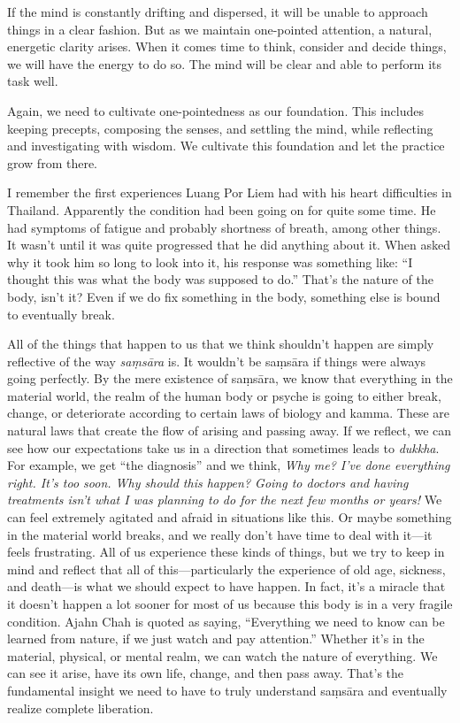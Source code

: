 If the mind is constantly drifting and dispersed, it will be unable to 
approach things in a clear fashion. But as we maintain one-pointed 
attention, a natural, energetic clarity arises. When it comes time to 
think, consider and decide things, we will have the energy to do so. 
The mind will be clear and able to perform its task well.

Again, we need to cultivate one-pointedness as our foundation. This 
includes keeping precepts, composing the senses, and settling the mind, 
while reflecting and investigating with wisdom. We cultivate this 
foundation and let the practice grow from there.


I remember the first experiences Luang Por Liem had with his heart 
difficulties in Thailand. Apparently the condition had been going on 
for quite some time. He had symptoms of fatigue and probably shortness 
of breath, among other things. It wasn't until it was quite progressed 
that he did anything about it. When asked why it took him so long to 
look into it, his response was something like: ``I thought this was 
what the body was supposed to do.'' That's the nature of the body, 
isn't it? Even if we do fix something in the body, something else is 
bound to eventually break.

All of the things that happen to us that we think shouldn't happen are 
simply reflective of the way \emph{saṃsāra} is. It wouldn't be 
saṃsāra if things were always going perfectly. By the mere existence 
of saṃsāra, we know that everything in the material world, the realm 
of the human body or psyche is going to either break, change, or 
deteriorate according to certain laws of biology and kamma. These are 
natural laws that create the flow of arising and passing away. If we 
reflect, we can see how our expectations take us in a direction that 
sometimes leads to \emph{dukkha}. For example, we get ``the diagnosis'' 
and we think, \emph{Why me? I've done everything right. It's too soon. 
Why should this happen? Going to doctors and having treatments isn't 
what I was planning to do for the next few months or years!} We can 
feel extremely agitated and afraid in situations like this. Or maybe 
something in the material world breaks, and we really don't have time 
to deal with it---it feels frustrating. All of us experience these 
kinds of things, but we try to keep in mind and reflect that all of 
this---particularly the experience of old age, sickness, and death---is 
what we should expect to have happen. In fact, it's a miracle that it 
doesn't happen a lot sooner for most of us because this body is in a 
very fragile condition. Ajahn Chah is quoted as saying, ``Everything we 
need to know can be learned from nature, if we just watch and pay 
attention.'' Whether it's in the material, physical, or mental realm, 
we can watch the nature of everything. We can see it arise, have its 
own life, change, and then pass away. That's the fundamental insight we 
need to have to truly understand saṃsāra and eventually realize 
complete liberation.

